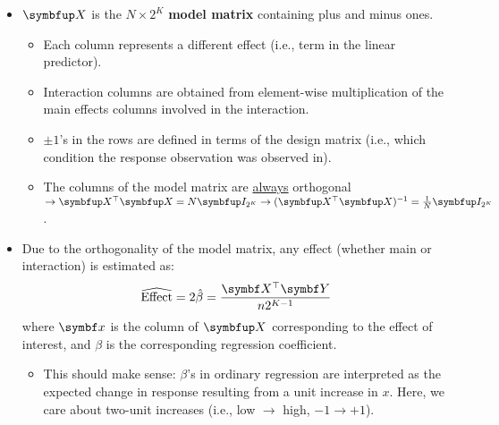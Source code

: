 \begin{itemize}
\begin{itemize}
              \item $ \Matrix{X} $ is the $ N\times 2^K $ \textbf{model matrix} containing plus and minus ones.
                    \begin{itemize}
                        \item Each column represents a different effect (i.e., term in the linear predictor).
                        \item Interaction columns are obtained from element-wise multiplication of the main effects columns involved in the interaction.
                        \item $ \pm 1 $'s in the rows are defined in terms of the design matrix (i.e., which condition the response observation was observed in).
                        \item The columns of the model matrix are \underline{always} orthogonal $ \rightarrow \Matrix{X}^\top \Matrix{X}=N\Matrix{I}_{2^K}
                                  \rightarrow (\Matrix{X}^\top \Matrix{X})^{-1}=\frac{1}{N}\Matrix{I}_{2^K}$.
                    \end{itemize}
              \item Due to the orthogonality of the model matrix, any effect (whether main or interaction) is estimated as:
                    \[ \widehat{\text{Effect}}=2\hat{\beta}=\frac{\Vector{X}^\top \RandomVector{Y}}{n 2^{K-1}}  \]
                    where $ \Vector{x} $ is the column of $ \Matrix{X} $ corresponding to the effect of interest, and $ \beta $ is the corresponding
                    regression coefficient.
                    \begin{itemize}[$\star$]
                        \item This should make sense: $ \beta $'s in ordinary regression are interpreted as the expected change in response
                              resulting from a unit increase in $ x $. Here, we care about two-unit increases (i.e., low $\rightarrow $ high, $-1\rightarrow +1$).
                    \end{itemize}
          \end{itemize}
\end{itemize}
